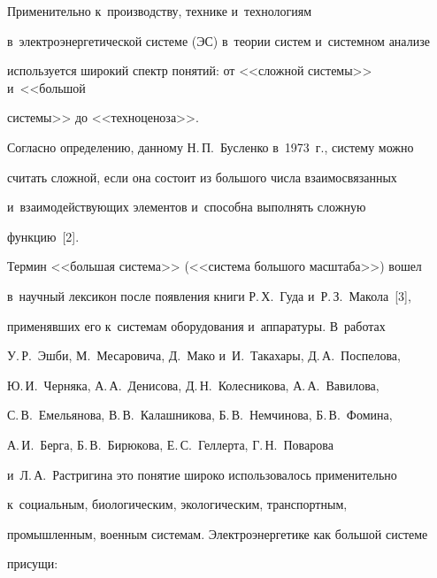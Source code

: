   


  Применительно к~производству, технике и~технологиям 


в~электроэнергетической системе (ЭС) в~теории систем и~системном анализе 


используется широкий спектр понятий: от <<сложной системы>> и~<<большой 


системы>> до <<техноценоза>>. 


  


  Согласно определению, данному Н.\,П.~Бусленко в~1973~г., систему можно 


считать сложной, если она состоит из большого числа взаимосвязанных 


и~взаимодействующих элементов и~способна выполнять сложную 


функцию~[2].


  


  Термин <<большая система>> (<<система большого масштаба>>) вошел 


в~научный лексикон после появления книги Р.\,Х.~Гуда и~Р.\,З.~Макола~[3], 


применявших его к~системам оборудования и~аппаратуры. В~работах 


У.\,Р.~Эшби, М.~Месаровича, Д.~Мако и~И.~Такахары, Д.\,А.~Поспелова, 


Ю.\,И.~Черняка, А.\,А.~Денисова, Д.\,Н.~Колесникова, А.\,А.~Вавилова, 


С.\,В.~Емельянова, В.\,В.~Калашникова, Б.\,В.~Немчинова, Б.\,В.~Фомина, 


А.\,И.~Берга, Б.\,В.~Бирюкова, Е.\,С.~Геллерта, Г.\,Н.~Поварова 


и~Л.\,А.~Растригина это понятие широко использовалось применительно 


к~социальным, биологическим, экологическим, транспортным, 


промышленным, военным системам. Электроэнергетике как большой системе 


присущи: 



